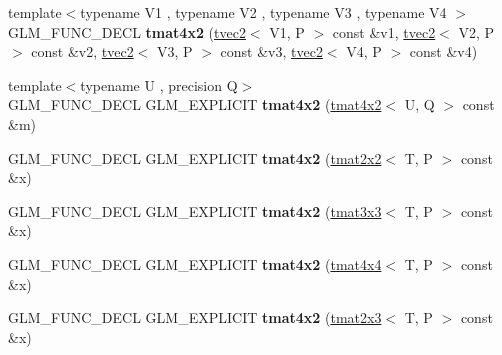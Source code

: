 \begin{DoxyCompactItemize}
\item 
\mbox{\label{structglm_1_1tmat4x2_a7cd1e8f9db551f8fd8e813c19896349f}} 
{\footnotesize template$<$typename V1 , typename V2 , typename V3 , typename V4 $>$ }\\G\+L\+M\+\_\+\+F\+U\+N\+C\+\_\+\+D\+E\+CL {\bfseries tmat4x2} (\hyperlink{structglm_1_1tvec2}{tvec2}$<$ V1, P $>$ const \&v1, \hyperlink{structglm_1_1tvec2}{tvec2}$<$ V2, P $>$ const \&v2, \hyperlink{structglm_1_1tvec2}{tvec2}$<$ V3, P $>$ const \&v3, \hyperlink{structglm_1_1tvec2}{tvec2}$<$ V4, P $>$ const \&v4)
\item 
\mbox{\label{structglm_1_1tmat4x2_a23ca50837bdbc3d1d47bd7010bdb7fa3}} 
{\footnotesize template$<$typename U , precision Q$>$ }\\G\+L\+M\+\_\+\+F\+U\+N\+C\+\_\+\+D\+E\+CL G\+L\+M\+\_\+\+E\+X\+P\+L\+I\+C\+IT {\bfseries tmat4x2} (\hyperlink{structglm_1_1tmat4x2}{tmat4x2}$<$ U, Q $>$ const \&m)
\item 
\mbox{\label{structglm_1_1tmat4x2_adf75877dc039cf1917ba16de5be8510e}} 
G\+L\+M\+\_\+\+F\+U\+N\+C\+\_\+\+D\+E\+CL G\+L\+M\+\_\+\+E\+X\+P\+L\+I\+C\+IT {\bfseries tmat4x2} (\hyperlink{structglm_1_1tmat2x2}{tmat2x2}$<$ T, P $>$ const \&x)
\item 
\mbox{\label{structglm_1_1tmat4x2_ac17d0b3d38b30480a59583b8821fe5c2}} 
G\+L\+M\+\_\+\+F\+U\+N\+C\+\_\+\+D\+E\+CL G\+L\+M\+\_\+\+E\+X\+P\+L\+I\+C\+IT {\bfseries tmat4x2} (\hyperlink{structglm_1_1tmat3x3}{tmat3x3}$<$ T, P $>$ const \&x)
\item 
\mbox{\label{structglm_1_1tmat4x2_a746f9d523f75bee0286be20a38293a2d}} 
G\+L\+M\+\_\+\+F\+U\+N\+C\+\_\+\+D\+E\+CL G\+L\+M\+\_\+\+E\+X\+P\+L\+I\+C\+IT {\bfseries tmat4x2} (\hyperlink{structglm_1_1tmat4x4}{tmat4x4}$<$ T, P $>$ const \&x)
\item 
\mbox{\label{structglm_1_1tmat4x2_acecefe71f4a19f72cf988f0858036d5f}} 
G\+L\+M\+\_\+\+F\+U\+N\+C\+\_\+\+D\+E\+CL G\+L\+M\+\_\+\+E\+X\+P\+L\+I\+C\+IT {\bfseries tmat4x2} (\hyperlink{structglm_1_1tmat2x3}{tmat2x3}$<$ T, P $>$ const \&x)
\item 
\mbox{\label{structglm_1_1tmat4x2_a0a7ddc1c8f35c932b5b4084fe83d6d89}} 

\end{DoxyCompactItemize}
